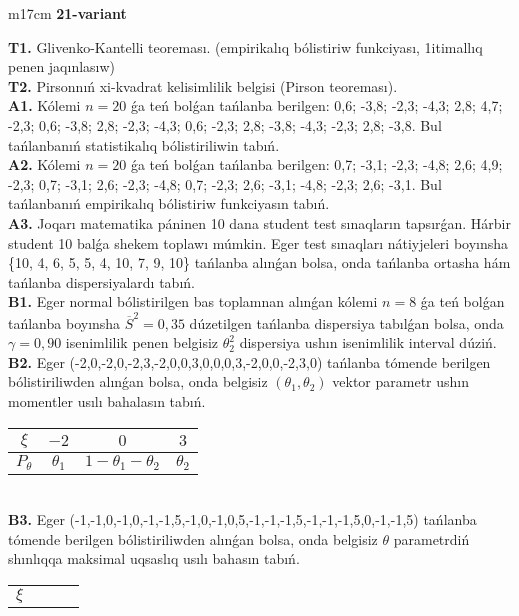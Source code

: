 \documentclass{article}
\begin{document}
\begin{tabular}{m{17cm}}
\textbf{21-variant}
\newline

\textbf{T1.} 
Glivenko-Kantelli teoreması. (empirikalıq bólistiriw funkciyası, 1itimallıq penen jaqınlasıw)
 \\
\textbf{T2.} 
Pirsonnıń xi-kvadrat kelisimlilik belgisi (Pirson teoreması).
 \\
\textbf{A1.} 
Kólemi \(n = 20\) ǵa teń bolǵan tańlanba berilgen: 0,6; -3,8; -2,3; -4,3; 2,8; 4,7; -2,3; 0,6; -3,8; 2,8; -2,3; -4,3; 0,6; -2,3; 2,8; -3,8; -4,3; -2,3; 2,8; -3,8. Bul tańlanbanıń statistikalıq bólistiriliwin tabıń.
 \\
\textbf{A2.} 
Kólemi \(n = 20\) ǵa teń bolǵan tańlanba berilgen: 0,7; -3,1; -2,3; -4,8; 2,6; 4,9; -2,3; 0,7; -3,1; 2,6; -2,3; -4,8; 0,7; -2,3; 2,6; -3,1; -4,8; -2,3; 2,6; -3,1. Bul tańlanbanıń empirikalıq bólistiriw funkciyasın tabıń.
 \\
\textbf{A3.} 
Joqarı matematika páninen 10 dana student test sınaqların tapsırǵan. Hárbir student 10 balǵa shekem toplawı múmkin. Eger test sınaqları nátiyjeleri boyınsha \{10, 4, 6, 5, 5, 4, 10, 7, 9, 10\} tańlanba alınǵan bolsa, onda tańlanba ortasha hám tańlanba dispersiyalardı tabıń.
 \\
\textbf{B1.} 
Eger normal bólistirilgen bas toplamnan alınǵan kólemi \(n = 8\) ǵa teń bolǵan tańlanba boyınsha \({\overline{S}}^{2} = 0,35\) dúzetilgen tańlanba dispersiya tabılǵan bolsa, onda \(\gamma = 0,90\) isenimlilik penen belgisiz \(\theta_{2}^{2}\) dispersiya ushın isenimlilik interval dúziń.
 \\
\textbf{B2.} 
Eger (-2,0,-2,0,-2,3,-2,0,0,3,0,0,0,3,-2,0,0,-2,3,0) tańlanba tómende berilgen bólistiriliwden alınǵan bolsa, onda belgisiz \(\left( \theta_{1},\theta_{2} \right)\) vektor parametr ushın momentler usılı bahalasın tabıń.
\begin{tabular}{|c|c|c|c|}
  \hline
$\xi$ &
$- 2$ &
$0$ &
$3$\\
\hline
\(P_{\theta}\) & \(\theta_{1}\) & \(1 - \theta_{1} - \theta_{2}\) & \(\theta_{2}\) \\
\hline
\end{tabular}
 \\
\textbf{B3.} 
Eger (-1,-1,0,-1,0,-1,-1,5,-1,0,-1,0,5,-1,-1,-1,5,-1,-1,-1,5,0,-1,-1,5) tańlanba tómende berilgen bólistiriliwden alınǵan bolsa, onda belgisiz \(\theta\) parametrdiń shınlıqqa maksimal uqsaslıq usılı bahasın tabıń.
\begin{tabular}{|c|c|c|c|}
  \hline
$\xi$

\end{tabular}
\end{tabular}
\end{document}
